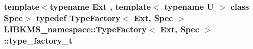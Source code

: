 \hypertarget{classLIBKMS__namespace_1_1TypeFactory_a1ea3eb75810d29bed5a7f017e188a43d}{
\subsubsection[{type\-\_\-factory\-\_\-t}]{\setlength{\rightskip}{0pt plus 5cm}template$<$typename Ext , template$<$ typename U $>$ class Spec$>$ typedef {\bf Type\-Factory}$<$ Ext, Spec $>$ {\bf L\-I\-B\-K\-M\-S\-\_\-namespace\-::\-Type\-Factory}$<$ Ext, Spec $>$\-::{\bf type\-\_\-factory\-\_\-t}}}\label{classLIBKMS__namespace_1_1TypeFactory_a1ea3eb75810d29bed5a7f017e188a43d}



